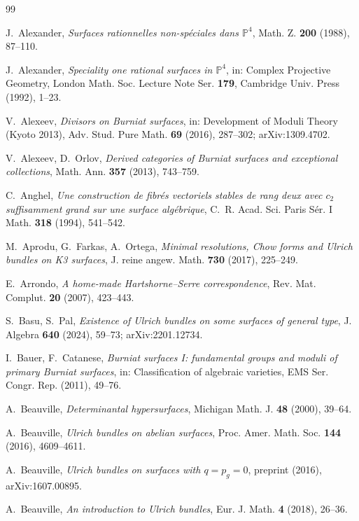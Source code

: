 \documentclass{amsart}
\theoremstyle{definition}
\newcommand{\PP}{\mathbb{P}}
\begin{document}
\begin{thebibliography}{99}

J.~Alexander,
\emph{Surfaces rationnelles non-sp\'eciales dans $\PP^4$},
Math. Z. \textbf{200} (1988), 87--110.

J.~Alexander,
\emph{Speciality one rational surfaces in $\PP^4$},
in: Complex Projective Geometry, London Math. Soc. Lecture Note Ser. \textbf{179}, Cambridge Univ. Press (1992), 1--23.

V.~Alexeev,
\emph{Divisors on Burniat surfaces},
in: Development of Moduli Theory (Kyoto 2013), Adv. Stud. Pure Math. \textbf{69} (2016), 287--302; arXiv:1309.4702.

V.~Alexeev, D.~Orlov,
\emph{Derived categories of Burniat surfaces and exceptional collections},
Math. Ann. \textbf{357} (2013), 743--759.

C.~Anghel,
\emph{Une construction de fibr\'es vectoriels stables de rang deux avec $c_2$ suffisamment grand sur une surface alg\'ebrique},
C.~R. Acad. Sci. Paris S\'er. I Math. \textbf{318} (1994), 541--542.

M.~Aprodu, G.~Farkas, A.~Ortega,
\emph{Minimal resolutions, Chow forms and Ulrich bundles on K3 surfaces},
J. reine angew. Math. \textbf{730} (2017), 225--249.

E.~Arrondo,
\emph{A home-made Hartshorne--Serre correspondence},
Rev. Mat. Complut. \textbf{20} (2007), 423--443.

S.~Basu, S.~Pal,
\emph{Existence of Ulrich bundles on some surfaces of general type},
J. Algebra \textbf{640} (2024), 59--73; arXiv:2201.12734.

I.~Bauer, F.~Catanese,
\emph{Burniat surfaces I: fundamental groups and moduli of primary Burniat surfaces},
in: Classification of algebraic varieties, EMS Ser. Congr. Rep. (2011), 49--76.

A.~Beauville,
\emph{Determinantal hypersurfaces},
Michigan Math. J. \textbf{48} (2000), 39--64.

A.~Beauville,
\emph{Ulrich bundles on abelian surfaces},
Proc. Amer. Math. Soc. \textbf{144} (2016), 4609--4611.

A.~Beauville,
\emph{Ulrich bundles on surfaces with $q=p_g=0$},
preprint (2016), arXiv:1607.00895.

A.~Beauville,
\emph{An introduction to Ulrich bundles},
Eur. J. Math. \textbf{4} (2018), 26--36.


\end{thebibliography}
\end{document}

